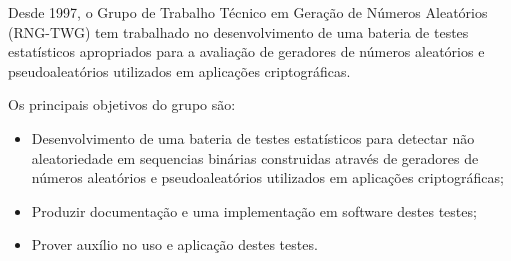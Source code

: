 Desde 1997, o Grupo de Trabalho Técnico em Geração de Números Aleatórios (RNG-TWG) tem trabalhado no desenvolvimento de uma bateria de testes estatísticos apropriados para a avaliação de geradores de números aleatórios e pseudoaleatórios utilizados em aplicações criptográficas. 

Os principais objetivos do grupo são:
  \begin{itemize}
   \item Desenvolvimento de uma bateria de testes estatísticos para detectar não aleatoriedade em sequencias binárias construidas através de geradores de números aleatórios e pseudoaleatórios utilizados em aplicações criptográficas;
   \item Produzir documentação e uma implementação em software destes testes;
   \item Prover auxílio no uso e aplicação destes testes.
  \end{itemize}


